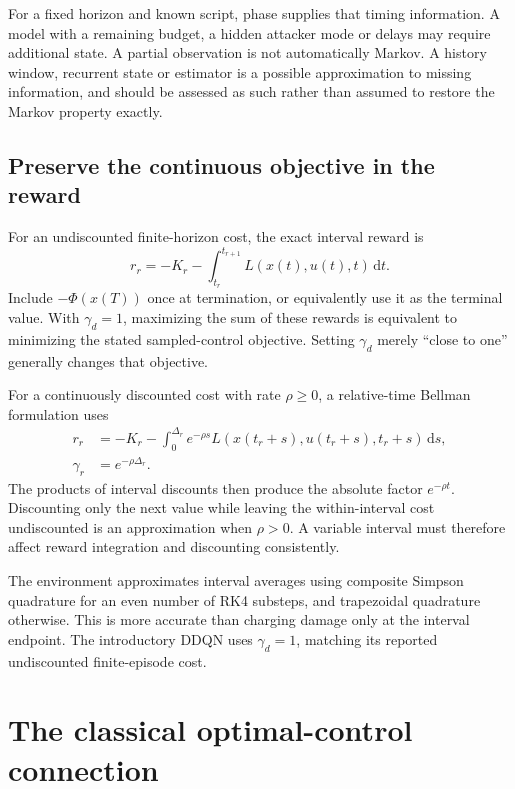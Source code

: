 \documentclass[11pt,a4paper]{article}
\newcommand{\dd}{\,\mathrm{d}}
\theoremstyle{definition}
\theoremstyle{remark}
\begin{document}
For a fixed horizon and known script, phase supplies that timing information. A model with a remaining budget, a hidden attacker mode or delays may require additional state. A partial observation is not automatically Markov. A history window, recurrent state or estimator is a possible approximation to missing information, and should be assessed as such rather than assumed to restore the Markov property exactly.

\subsection{Preserve the continuous objective in the reward}
For an undiscounted finite-horizon cost, the exact interval reward is
\begin{equation}
r_r=-K_r-\int_{t_r}^{t_{r+1}}L(x(t),u(t),t)\dd t.
\end{equation}
Include $-\Phi(x(T))$ once at termination, or equivalently use it as the terminal value. With $\gamma_d=1$, maximizing the sum of these rewards is equivalent to minimizing the stated sampled-control objective. Setting $\gamma_d$ merely ``close to one'' generally changes that objective.

For a continuously discounted cost with rate $\rho\ge0$, a relative-time Bellman formulation uses
\begin{align}
r_r&=-K_r-\int_0^{\Delta_r}e^{-\rho s}L(x(t_r+s),u(t_r+s),t_r+s)\dd s,\nonumber\\
\gamma_r&=e^{-\rho\Delta_r}.
\label{eq:discount}
\end{align}
The products of interval discounts then produce the absolute factor $e^{-\rho t}$. Discounting only the next value while leaving the within-interval cost undiscounted is an approximation when $\rho>0$. A variable interval must therefore affect reward integration and discounting consistently.

The environment approximates interval averages using composite Simpson quadrature for an even number of RK4 substeps, and trapezoidal quadrature otherwise. This is more accurate than charging damage only at the interval endpoint. The introductory DDQN uses $\gamma_d=1$, matching its reported undiscounted finite-episode cost.

\section{The classical optimal-control connection}
\end{document}

